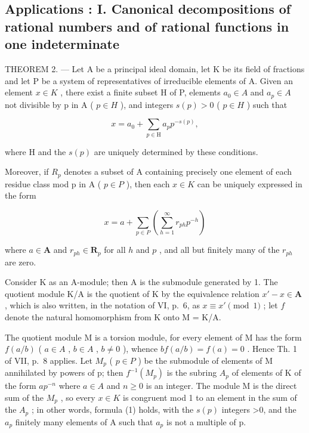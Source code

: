 \subsection{Applications : I. Canonical decompositions of rational numbers and of rational functions in one indeterminate}

THEOREM 2. --- Let A be a principal ideal domain, let K be its field of fractions and let P be a system of representatives of irreducible elements of A. Given an element \(x \in K\) , there exist a finite subset H of P, elements \(a_{0} \in A\) and \(a_{p} \in A\) not divisible by p in A ( \(p \in H\) ), and integers \(s(p) > 0\) ( \(p \in H\) ) such that

\[
x = a _ {0} + \sum_ {p \in \mathrm{H}} a _ {p} p ^ {- s (p)},\tag{1}
\]

where H and the \(s(p)\) are uniquely determined by these conditions.

Moreover, if \(R_{p}\) denotes a subset of A containing precisely one element of each residue class mod p in A ( \(p \in P\) ), then each \(x \in K\) can be uniquely expressed in the form

\[
x = a + \sum_ {p \in P} \left(\sum_ {h = 1} ^ {\infty} r _ {p h} p ^ {- h}\right)\tag{2}
\]

where \(a \in \mathbf{A}\) and \(r_{ph} \in \mathbf{R}_p\) for all \(h\) and \(p\) , and all but finitely many of the \(r_{ph}\) are zero.

Consider K as an A-module; then A is the submodule generated by 1. The quotient module K/A is the quotient of K by the equivalence relation \(x' - x \in \mathbf{A}\) , which is also written, in the notation of VI, p.~6, as \(x \equiv x' \pmod{1}\) ; let \(f\) denote the natural homomorphism from K onto M = K/A.

The quotient module M is a torsion module, for every element of M has the form \(f(a/b)\) ( \(a \in A\) , \(b \in A\) , \(b \neq 0\) ), whence \(bf(a/b) = f(a) = 0\) . Hence Th. 1 of VII, p.~8 applies. Let \(M_{p}\) ( \(p \in P\) ) be the submodule of elements of M annihilated by powers of p; then \(f^{-1}(M_{p})\) is the subring \(A_{p}\) of elements of K of the form \(ap^{-n}\) where \(a \in A\) and \(n \geqslant 0\) is an integer. The module M is the direct sum of the \(M_{p}\) , so every \(x \in K\) is congruent mod 1 to an element in the sum of the \(A_{p}\) ; in other words, formula (1) holds, with the \(s(p)\) integers \textgreater0, and the \(a_{p}\) finitely many elements of A such that \(a_{p}\) is not a multiple of p.


